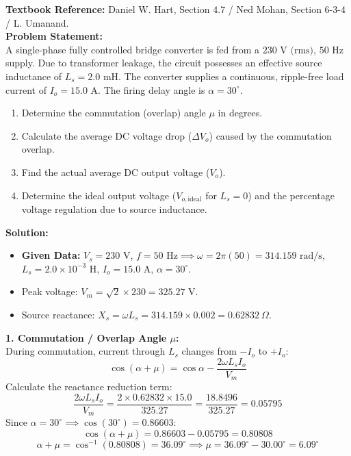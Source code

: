 \documentclass[10pt,a4paper]{article}
\begin{document}
\begin{tcolorbox}[qbox, title={Question 6: Commutation Overlap in Single-Phase Full Converter}]
\textbf{Textbook Reference:} Daniel W. Hart, Section 4.7 / Ned Mohan, Section 6-3-4 / L. Umanand.\\[1mm]
\textbf{Problem Statement:}\\
A single-phase fully controlled bridge converter is fed from a $230\text{ V (rms)}$, $50\text{ Hz}$ supply. Due to transformer leakage, the circuit possesses an effective source inductance of $L_s = 2.0\text{ mH}$. The converter supplies a continuous, ripple-free load current of $I_o = 15.0\text{ A}$. The firing delay angle is $\alpha = 30^\circ$.
\begin{enumerate}
  \item Determine the commutation (overlap) angle $\mu$ in degrees.
  \item Calculate the average DC voltage drop ($\Delta V_o$) caused by the commutation overlap.
  \item Find the actual average DC output voltage ($V_o$).
  \item Determine the ideal output voltage ($V_{o,\text{ideal}}$ for $L_s = 0$) and the percentage voltage regulation due to source inductance.
\end{enumerate}
\end{tcolorbox}

\vspace{1mm}
\noindent\textbf{\textcolor{accentteal}{Solution:}}
\begin{itemize}
  \item \textbf{Given Data:} $V_s = 230\text{ V}$, $f = 50\text{ Hz} \implies \omega = 2\pi(50) = 314.159\text{ rad/s}$, $L_s = 2.0\times 10^{-3}\text{ H}$, $I_o = 15.0\text{ A}$, $\alpha = 30^\circ$.
  \item Peak voltage: $V_m = \sqrt{2} \times 230 = 325.27\text{ V}$.
  \item Source reactance: $X_s = \omega L_s = 314.159 \times 0.002 = 0.62832\ \Omega$.
\end{itemize}

\noindent\textbf{1. Commutation / Overlap Angle $\mu$:}\\
During commutation, current through $L_s$ changes from $-I_o$ to $+I_o$:
\[
\cos(\alpha + \mu) = \cos\alpha - \frac{2 \omega L_s I_o}{V_m}
\]
Calculate the reactance reduction term:
\[
\frac{2 \omega L_s I_o}{V_m} = \frac{2 \times 0.62832 \times 15.0}{325.27} = \frac{18.8496}{325.27} = 0.05795
\]
Since $\alpha = 30^\circ \implies \cos(30^\circ) = 0.86603$:
\[
\cos(\alpha + \mu) = 0.86603 - 0.05795 = 0.80808
\]
\[
\alpha + \mu = \cos^{-1}(0.80808) = 36.09^\circ \implies \mu = 36.09^\circ - 30.00^\circ = \mathbf{6.09^\circ}
\]
\end{document}
